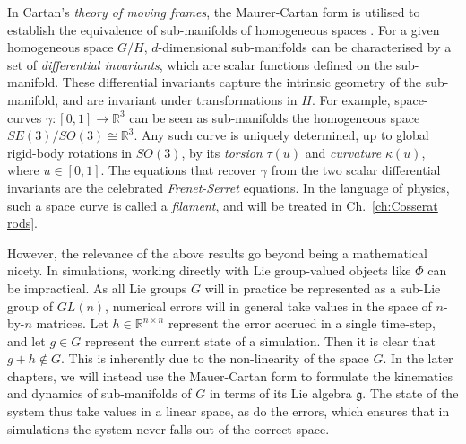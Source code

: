 In Cartan's \textit{theory of moving frames}, the Maurer-Cartan form is utilised to establish the equivalence of sub-manifolds of homogeneous spaces \citep{levyReviewElieCartan1935, clellandFrenetCartanMethod2017, olverSurveyMovingFrames2005, gardnerMethodEquivalenceIts1989}. For a given homogeneous space $G/H$, $d$-dimensional sub-manifolds can be characterised by a set of \textit{differential invariants}, which are scalar functions defined on the sub-manifold. These differential invariants capture the intrinsic geometry of the sub-manifold, and are invariant under transformations in $H$.  For example, space-curves $\gamma : [0,1] \to \mathbb{R}^3$ can be seen as sub-manifolds the homogeneous space $SE(3) / SO(3) \cong \mathbb{R}^3$. Any such curve is uniquely determined, up to global rigid-body rotations in $SO(3)$, by its \textit{torsion} $\tau(u)$ and \textit{curvature} $\kappa(u)$, where $u \in [0,1]$. The equations that recover $\gamma$ from the two scalar differential invariants are the celebrated \textit{Frenet-Serret} equations. In the language of physics, such a space curve is called a \textit{filament}, and will be treated in Ch.~\ref{ch:Cosserat rods}.

However, the relevance of the above results go beyond being a mathematical nicety. In simulations, working directly with Lie group-valued objects like $\Phi$ can be impractical. As all Lie groups $G$ will in practice be represented as a sub-Lie group of $GL(n)$, numerical errors will in general take values in the space of $n$-by-$n$ matrices. Let $h \in \mathbb{R}^{n \times n}$ represent the error accrued in a single time-step, and let $g \in G$ represent the current state of a simulation. Then it is clear that $g + h \not\in G$. This is inherently due to the non-linearity of the space $G$. In the later chapters, we will instead use the Mauer-Cartan form to formulate the kinematics and dynamics of sub-manifolds of $G$ in terms of its Lie algebra $\mathfrak{g}$. The state of the system thus take values in a linear space, as do the errors, which ensures that in simulations the system never falls out of the correct space.


